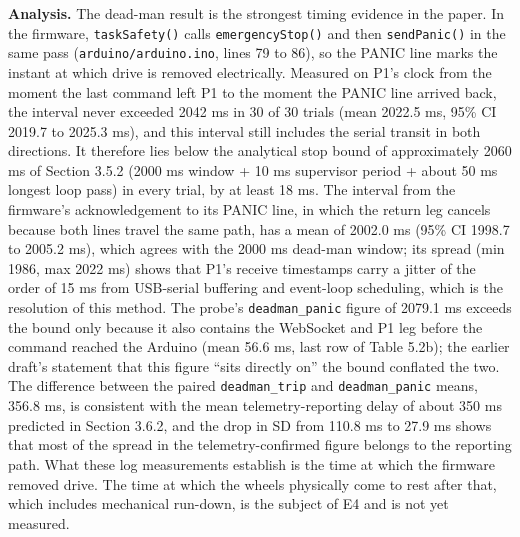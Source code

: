 \textbf{Analysis.} The dead-man result is the strongest timing evidence in the paper. In the firmware, \texttt{taskSafety()} calls \texttt{emergencyStop()} and then \texttt{sendPanic()} in the same pass (\texttt{arduino/arduino.ino}, lines 79 to 86), so the PANIC line marks the instant at which drive is removed electrically. Measured on P1's clock from the moment the last command left P1 to the moment the PANIC line arrived back, the interval never exceeded 2042 ms in 30 of 30 trials (mean 2022.5 ms, 95\% CI 2019.7 to 2025.3 ms), and this interval still includes the serial transit in both directions. It therefore lies below the analytical stop bound of approximately 2060 ms of Section 3.5.2 (2000 ms window + 10 ms supervisor period + about 50 ms longest loop pass) in every trial, by at least 18 ms. The interval from the firmware's acknowledgement to its PANIC line, in which the return leg cancels because both lines travel the same path, has a mean of 2002.0 ms (95\% CI 1998.7 to 2005.2 ms), which agrees with the 2000 ms dead-man window; its spread (min 1986, max 2022 ms) shows that P1's receive timestamps carry a jitter of the order of 15 ms from USB-serial buffering and event-loop scheduling, which is the resolution of this method. The probe's \texttt{deadman\_panic} figure of 2079.1 ms exceeds the bound only because it also contains the WebSocket and P1 leg before the command reached the Arduino (mean 56.6 ms, last row of Table 5.2b); the earlier draft's statement that this figure ``sits directly on'' the bound conflated the two. The difference between the paired \texttt{deadman\_trip} and \texttt{deadman\_panic} means, 356.8 ms, is consistent with the mean telemetry-reporting delay of about 350 ms predicted in Section 3.6.2, and the drop in SD from 110.8 ms to 27.9 ms shows that most of the spread in the telemetry-confirmed figure belongs to the reporting path. What these log measurements establish is the time at which the firmware removed drive. The time at which the wheels physically come to rest after that, which includes mechanical run-down, is the subject of E4 and is not yet measured.

